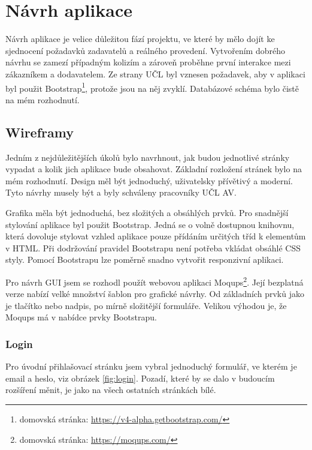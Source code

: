 \chapter{Návrh aplikace}
    Návrh aplikace je velice důležitou fází projektu, ve které by mělo dojít ke sjednocení požadavků zadavatelů a reálného provedení. Vytvořením dobrého návrhu se zamezí případným kolizím a zároveň proběhne první interakce mezi zákazníkem a dodavatelem. Ze strany UČL byl vznesen požadavek, aby v aplikaci byl použit Bootstrap\footnote{domovská stránka: \url{https://v4-alpha.getbootstrap.com/}}, protože jsou na něj zvyklí. Databázové schéma bylo čistě na mém rozhodnutí.
    
    \section{Wireframy}

        Jedním z nejdůležitějších úkolů bylo navrhnout, jak budou jednotlivé stránky vypadat a kolik jich aplikace bude obsahovat. Základní rozložení stránek bylo na mém rozhodnutí. Design měl být jednoduchý, uživatelsky přívětivý a moderní. Tyto návrhy musely být a byly schváleny pracovníky UČL AV.
        
        Grafika měla být jednoduchá, bez složitých a obsáhlých prvků. Pro snadnější stylování aplikace byl použit Bootstrap. Jedná se o volně dostupnou knihovnu, která dovoluje stylovat vzhled aplikace pouze přídáním určitých tříd k elementům v HTML. Při dodržování pravidel Bootstrapu není potřeba vkládat obsáhlé CSS styly. Pomocí Bootstrapu lze poměrně snadno vytvořit responzivní aplikaci.
        
        Pro návrh GUI jsem se rozhodl použít webovou aplikaci Moqups\footnote{domovská stránka: \url{https://moqups.com/}}. Její bezplatná verze nabízí velké množství šablon pro grafické návrhy. Od základních prvků jako je tlačítko nebo nadpis, po mírně složitější formuláře. Velikou výhodou je, že Moqups má v nabídce prvky Bootstrapu. 
        
        \subsection{Login}
            Pro úvodní přihlašovací stránku jsem vybral jednoduchý formulář, ve kterém je email a heslo, viz obrázek \ref{fig:login}. Pozadí, které by se dalo v budoucím rozšíření měnit, je jako na všech ostatních stránkách bílé.
            
